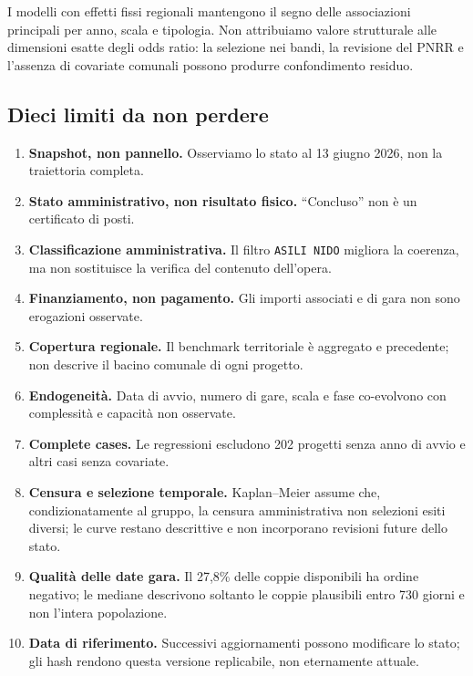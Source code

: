 \documentclass[10pt,a4paper]{article}
\begin{document}
\begin{table}[H]
\centering
\caption{Controlli descrittivi di sensibilità}
\label{tab:sensitivity}
\resizebox{0.92\textwidth}{!}{}
\end{table}

I modelli con effetti fissi regionali mantengono il segno delle associazioni principali per anno, scala e tipologia. Non attribuiamo valore strutturale alle dimensioni esatte degli odds ratio: la selezione nei bandi, la revisione del PNRR e l'assenza di covariate comunali possono produrre confondimento residuo.

\subsection{Dieci limiti da non perdere}

\begin{enumerate}
  \item \textbf{Snapshot, non pannello.} Osserviamo lo stato al 13 giugno 2026, non la traiettoria completa.
  \item \textbf{Stato amministrativo, non risultato fisico.} \textquotedblleft{}Concluso\textquotedblright{} non è un certificato di posti.
  \item \textbf{Classificazione amministrativa.} Il filtro \texttt{ASILI NIDO} migliora la coerenza, ma non sostituisce la verifica del contenuto dell'opera.
  \item \textbf{Finanziamento, non pagamento.} Gli importi associati e di gara non sono erogazioni osservate.
  \item \textbf{Copertura regionale.} Il benchmark territoriale è aggregato e precedente; non descrive il bacino comunale di ogni progetto.
  \item \textbf{Endogeneità.} Data di avvio, numero di gare, scala e fase co-evolvono con complessità e capacità non osservate.
  \item \textbf{Complete cases.} Le regressioni escludono 202 progetti senza anno di avvio e altri casi senza covariate.
  \item \textbf{Censura e selezione temporale.} Kaplan--Meier assume che, condizionatamente al gruppo, la censura amministrativa non selezioni esiti diversi; le curve restano descrittive e non incorporano revisioni future dello stato.
  \item \textbf{Qualità delle date gara.} Il 27,8\% delle coppie disponibili ha ordine negativo; le mediane descrivono soltanto le coppie plausibili entro 730 giorni e non l'intera popolazione.
  \item \textbf{Data di riferimento.} Successivi aggiornamenti possono modificare lo stato; gli hash rendono questa versione replicabile, non eternamente attuale.
\end{enumerate}
\end{document}
